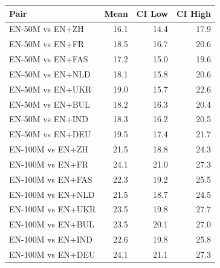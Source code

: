 \begin{tabular}{@{}lrrr@{}}
\toprule
Pair & Mean & CI Low & CI High \\
\midrule
EN-50M vs EN+ZH & 16.1 & 14.4 & 17.9 \\
EN-50M vs EN+FR & 18.5 & 16.7 & 20.6 \\
EN-50M vs EN+FAS & 17.2 & 15.0 & 19.6 \\
EN-50M vs EN+NLD & 18.1 & 15.8 & 20.6 \\
EN-50M vs EN+UKR & 19.0 & 15.7 & 22.6 \\
EN-50M vs EN+BUL & 18.2 & 16.3 & 20.4 \\
EN-50M vs EN+IND & 18.3 & 16.2 & 20.5 \\
EN-50M vs EN+DEU & 19.5 & 17.4 & 21.7 \\
EN-100M vs EN+ZH & 21.5 & 18.8 & 24.3 \\
EN-100M vs EN+FR & 24.1 & 21.0 & 27.3 \\
EN-100M vs EN+FAS & 22.3 & 19.2 & 25.5 \\
EN-100M vs EN+NLD & 21.5 & 18.7 & 24.5 \\
EN-100M vs EN+UKR & 23.5 & 19.8 & 27.7 \\
EN-100M vs EN+BUL & 23.5 & 20.1 & 27.0 \\
EN-100M vs EN+IND & 22.6 & 19.8 & 25.8 \\
EN-100M vs EN+DEU & 24.1 & 21.1 & 27.3 \\
\bottomrule
\end{tabular}
